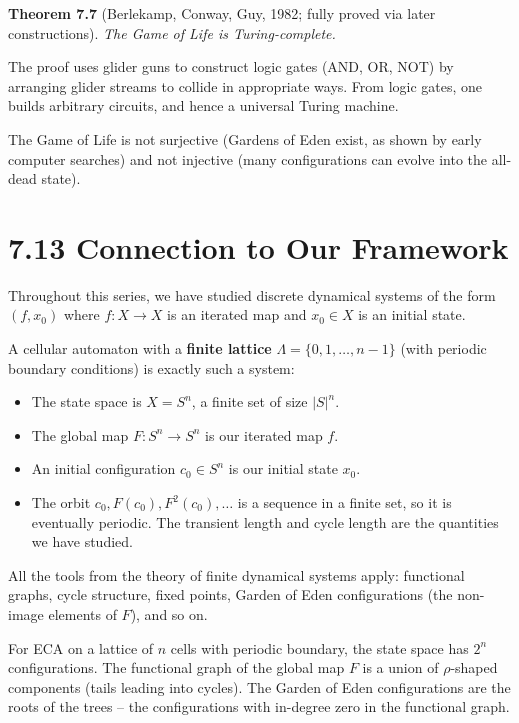 \textbf{Theorem 7.7} (Berlekamp, Conway, Guy, 1982; fully proved via later constructions). \textit{The Game of Life is Turing-complete.}

The proof uses glider guns to construct logic gates (AND, OR, NOT) by arranging glider streams to collide in appropriate ways. From logic gates, one builds arbitrary circuits, and hence a universal Turing machine.

The Game of Life is not surjective (Gardens of Eden exist, as shown by early computer searches) and not injective (many configurations can evolve into the all-dead state).


\section{7.13 Connection to Our Framework}

Throughout this series, we have studied discrete dynamical systems of the form $(f, x_0)$ where $f: X \to X$ is an iterated map and $x_0 \in X$ is an initial state.

A cellular automaton with a \textbf{finite lattice} $\Lambda = \{ 0, 1, \ldots, n-1\} $ (with periodic boundary conditions) is exactly such a system:

\begin{itemize}
  \item The state space is $X = S^n$, a finite set of size $|S|^n$.
  \item The global map $F: S^n \to S^n$ is our iterated map $f$.
  \item An initial configuration $c_0 \in S^n$ is our initial state $x_0$.
  \item The orbit $c_0, F(c_0), F^2(c_0), \ldots$ is a sequence in a finite set, so it is eventually periodic. The transient length and cycle length are the quantities we have studied.
\end{itemize}

All the tools from the theory of finite dynamical systems apply: functional graphs, cycle structure, fixed points, Garden of Eden configurations (the non-image elements of $F$), and so on.

For ECA on a lattice of $n$ cells with periodic boundary, the state space has $2^n$ configurations. The functional graph of the global map $F$ is a union of $\rho$-shaped components (tails leading into cycles). The Garden of Eden configurations are the roots of the trees -- the configurations with in-degree zero in the functional graph.

